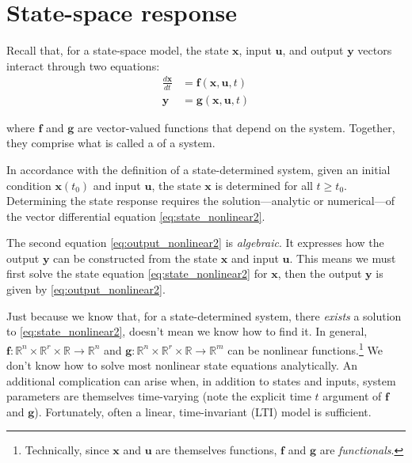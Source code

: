 \documentclass[dynamic_systems.tex]{subfiles}
\begin{document}
\chapter[State-space response]{State-space response}
\tags{}

Recall that, for a state-space model, the state $\bm{x}$, input $\bm{u}$, and output $\bm{y}$ vectors interact through two equations:
\tags{}
\begin{subequations}
\begin{align}
	\frac{d\bm{x}}{d t} &= \bm{f}(\bm{x},\bm{u},t) \label{eq:state_nonlinear2} \\
	\bm{y} &= \bm{g}(\bm{x},\bm{u},t)\label{eq:output_nonlinear2}
\end{align}
\end{subequations}

where $\bm{f}$ and $\bm{g}$ are vector-valued functions that depend on the system.
Together, they comprise what is called a  of a system.
\tags{}

In accordance with the definition of a state-determined system, %
given an initial condition $\bm{x}(t_0)$ and input $\bm{u}$, the state $\bm{x}$ is determined for all $t\ge t_0$.
Determining the state response requires the solution---analytic or numerical---of the vector differential equation \autoref{eq:state_nonlinear2}.
\tags{}

The second equation \eqref{eq:output_nonlinear2} is \emph{algebraic}.
It expresses how the output $\bm{y}$ can be constructed from the state $\bm{x}$ and input $\bm{u}$.
This means we must first solve the state equation \eqref{eq:state_nonlinear2} for $\bm{x}$, then the output $\bm{y}$ is given by \autoref{eq:output_nonlinear2}.
\tags{}

Just because we know that, for a state-determined system, there \emph{exists} a solution to \autoref{eq:state_nonlinear2}, doesn't mean we know how to find it.
In general, $\bm{f}:\mathbb{R}^n \times \mathbb{R}^r \times \mathbb{R}\rightarrow\mathbb{R}^n$ and $\bm{g}:\mathbb{R}^n \times \mathbb{R}^r \times \mathbb{R}\rightarrow\mathbb{R}^m$ can be nonlinear functions.\footnote{Technically, since $\bm{x}$ and $\bm{u}$ are themselves functions, $\bm{f}$ and $\bm{g}$ are \emph{functionals}.}
We don't know how to solve most nonlinear state equations analytically.
An additional complication can arise when, in addition to states and inputs, system parameters are themselves time-varying (note the explicit time $t$ argument of $\bm{f}$ and $\bm{g}$).
Fortunately, often a linear, time-invariant (LTI) model is sufficient.
\tags{}
\end{document}
